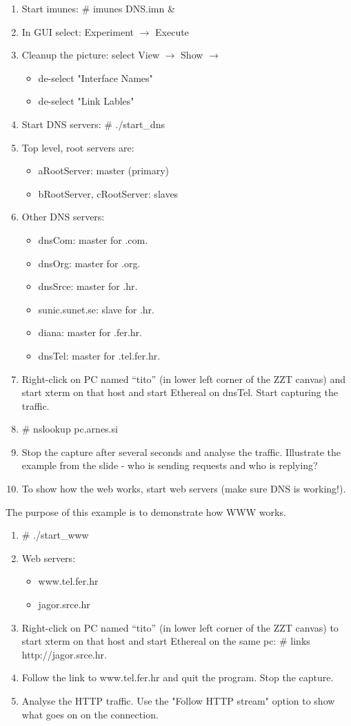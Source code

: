 \begin{enumerate}
\item	Start imunes: \# imunes DNS.imn \&
\item	In GUI select: Experiment $\to$ Execute
\item	Cleanup the picture: select View $\to$ Show $\to$ 
\begin{itemize}
  \item  de-select "Interface Names"
  \item  de-select "Link Lables" 
\end{itemize}
\item	Start DNS servers: \# ./start\_dns
\item	Top level, root servers are:
\begin{itemize}
  \item   aRootServer: master (primary)
  \item   bRootServer, cRootServer: slaves 
\end{itemize}
\item	Other DNS servers:
\begin{itemize}
  \item dnsCom: master for .com.
\item	dnsOrg: master for .org.
\item	dnsSrce:  master for .hr.
\item	sunic.sunet.se:    slave for .hr.
\item	diana: master for .fer.hr.
\item	dnsTel: master for .tel.fer.hr.
\end{itemize}
\item	Right-click on PC named ``tito'' (in lower left corner of the ZZT
canvas) and start xterm on that host and start Ethereal on dnsTel. Start
capturing the traffic.
\item	\# nslookup pc.arnes.si
\item	Stop the capture after several seconds and analyse the traffic.
Illustrate the example from the slide - who is sending requests and who is
replying?
\item	To show how the web works, start web servers (make sure DNS is
working!).
\end{enumerate}

The purpose of this example is to demonstrate how WWW works.

\begin{enumerate}
\item	\# ./start\_www
\item	Web servers:
\begin{itemize}
\item	www.tel.fer.hr
\item	jagor.srce.hr
\end{itemize}
\item	Right-click on PC named ``tito'' (in lower left corner of the ZZT
canvas) to start xterm on that host and start Ethereal on the same pc: \# links
http://jagor.srce.hr.
\item	Follow the link to www.tel.fer.hr and quit the program. Stop the capture.
\item	Analyse the HTTP traffic. Use the "Follow HTTP stream" option to show
what goes on on the connection.
\end{enumerate}
